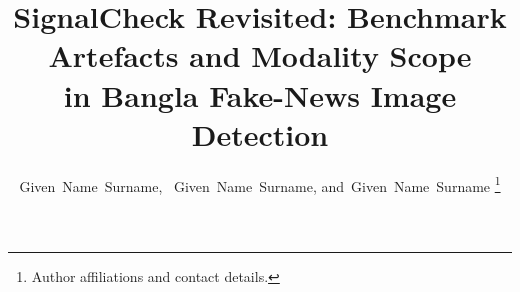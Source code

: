 \documentclass[journal]{IEEEtran}
\newif\ifblindsubmission
\newcommand{\sysname}{SignalCheck}
\begin{document}
\title{\sysname{} Revisited: Benchmark Artefacts and Modality Scope\\
in Bangla Fake-News Image Detection}

\ifblindsubmission
  \author{}
\else
  \author{Given~Name~Surname,~
          Given~Name~Surname,
          and~Given~Name~Surname
  \thanks{Author affiliations and contact details.}}
\fi

\maketitle


%
\end{document}
